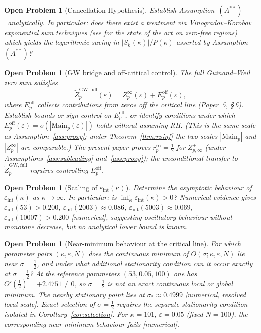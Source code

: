 \documentclass[11pt]{article}
\newtheorem{openproblem}[theorem]{Open Problem}
\newcommand{\Astar}{\ensuremath{(A^{**})}}  %
\begin{document}
\begin{openproblem}[Cancellation Hypothesis]
\label{op:cancel}
Establish Assumption~\Astar\ analytically.
In particular: does there exist a treatment via Vinogradov--Korobov
exponential sum techniques
(see \cite{MossinghoffTrudgianYang24,Bellotti24a} for the
state of the art on zero-free regions) which yields the logarithmic
saving in $|S_k(\kappa)|/P(\kappa)$ asserted by Assumption~\Astar?
\end{openproblem}

\begin{openproblem}[GW bridge and off-critical control]
\label{op:gwbridge}
The full Guinand--Weil zero sum satisfies
\[
\widetilde Z_p^{\mathrm{GW,full}}(\varepsilon)
= Z_p^\infty(\varepsilon) + E_p^{\mathrm{off}}(\varepsilon),
\]
where $E_p^{\mathrm{off}}$ collects contributions from zeros
off the critical line (Paper~5, \S\,6).
Establish bounds or sign control on $E_p^{\mathrm{off}}$,
or identify conditions under which
$E_p^{\mathrm{off}}(\varepsilon)=o(|\mathrm{Main}_p(\varepsilon)|)$
holds without assuming RH.
(This is the same scale as Assumption~\ref{ass:proxy};
under Theorem~\ref{thm:rpinf} the two scales
$|\mathrm{Main}_p|$ and $|Z_p^\infty|$ are comparable.)
The present paper proves $r_p^\infty=\tfrac12$ for $Z_{p,\infty}^+$
(under Assumptions~\ref{ass:subleading} and~\ref{ass:proxy});
the unconditional transfer to $\widetilde Z_p^{\mathrm{GW,full}}$
requires controlling $E_p^{\mathrm{off}}$.
\end{openproblem}

\begin{openproblem}[Scaling of $\varepsilon_{\mathrm{int}}(\kappa)$]
\label{op:epsc}
Determine the asymptotic behaviour of $\varepsilon_{\mathrm{int}}(\kappa)$ as $\kappa\to\infty$.
In particular: is $\inf_\kappa\varepsilon_{\mathrm{int}}(\kappa)>0$?
Numerical evidence gives $\varepsilon_{\mathrm{int}}(53)>0.200$, $\varepsilon_{\mathrm{int}}(2003)\approx 0.086$,
$\varepsilon_{\mathrm{int}}(5003)\approx 0.069$, $\varepsilon_{\mathrm{int}}(10007)>0.200$ [numerical],
suggesting oscillatory behaviour without monotone decrease, but no
analytical lower bound is known.
\end{openproblem}

\begin{openproblem}[Near-minimum behaviour at the critical line]
\label{op:global}
For which parameter pairs $(\kappa,\varepsilon,N)$ does the continuous
minimum of $O(\sigma;\kappa,\varepsilon,N)$ lie near $\sigma=\tfrac12$,
and under what additional stationarity condition can it occur exactly
at $\sigma=\tfrac12$?
At the reference parameters $(53,0.05,100)$ one has
$O'(\tfrac12)=+2.4751\ne 0$, so $\sigma=\tfrac12$ is not an exact
continuous local or global minimum.
The nearby stationary point lies at
$\sigma_*\approx 0.4999$ [numerical, resolved local scale].
Exact selection of $\sigma=\tfrac12$ requires the separate stationarity
condition isolated in Corollary~\ref{cor:selection}.
For $\kappa=101$, $\varepsilon=0.05$ (fixed $N=100$), the corresponding
near-minimum behaviour fails [numerical].
\end{openproblem}
\end{document}
